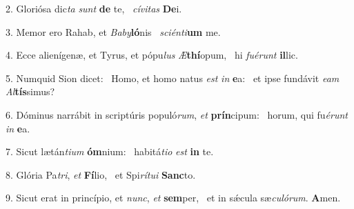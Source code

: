 2. Gloriósa dic\textit{ta} \textit{sunt} \textbf{de} te, \ast\  \textit{cí}\textit{vi}\textit{tas} \textbf{De}i.\

3. Memor ero Rahab, et \textit{Ba}\textit{by}\textbf{ló}nis \ast\  \textit{sci}\textit{én}\textit{ti}\textbf{um} me.\

4. Ecce alienígenæ, et Tyrus, et pópu\textit{lus} \textit{Æ}\textbf{thí}opum, \ast\  hi \textit{fu}\textit{é}\textit{runt} \textbf{il}lic.\

5. Numquid Sion dicet: \dag\  Homo, et homo natus \textit{est} \textit{in} \textbf{e}a: \ast\  et ipse fundávit \textit{e}\textit{am} \textit{Al}\textbf{tís}simus?\

6. Dóminus narrábit in scriptúris populó\textit{rum}, \textit{et} \textbf{prín}cipum: \ast\  horum, qui fu\textit{é}\textit{runt} \textit{in} \textbf{e}a.\

7. Sicut lætán\textit{ti}\textit{um} \textbf{óm}nium: \ast\  habitá\textit{ti}\textit{o} \textit{est} \textbf{in} te.\

8. Glória Pa\textit{tri}, \textit{et} \textbf{Fí}lio, \ast\  et Spi\textit{rí}\textit{tu}\textit{i} \textbf{Sanc}to.\

9. Sicut erat in princípio, et \textit{nunc}, \textit{et} \textbf{sem}per, \ast\  et in sǽcula sæ\textit{cu}\textit{ló}\textit{rum}. \textbf{A}men.\

